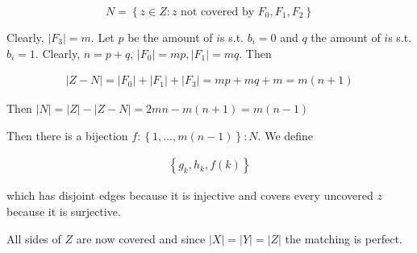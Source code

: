 \documentclass[a4paper, 12pt]{article}
\begin{document}
\begin{equation*}
    N = \left\{ z \in Z : z \text{ not covered by } F_0, F_1, F_2 \right\} 
\end{equation*}

Clearly, $|F_3| = m$. Let $p$ be the amount of $i$s s.t. $b_i = 0$
and $q$ the amount of $i$s s.t. $b_i = 1$. Clearly, $n = p + q$,
$|F_0| = mp, |F_1| = mq$. Then 

\begin{align*}
    |Z - N| = |F_0| + |F_1| + |F_3| = mp + mq + m = m(n+1)
\end{align*}

Then $|N| = |Z| - |Z - N| = 2mn - m(n+1) = m(n-1)$

Then there is a bijection $f : \left\{ 1, \ldots, m(n-1) \right\} : N $. 
We define 

\begin{align*}
    \left\{ g_k, h_k, f(k) \right\} 
\end{align*}

which has disjoint edges because it is injective and covers 
every uncovered $z$ because it is surjective. 

All sides of $Z$ are now covered and since $|X| = |Y| = |Z|$
the matching is perfect.
\end{document}
